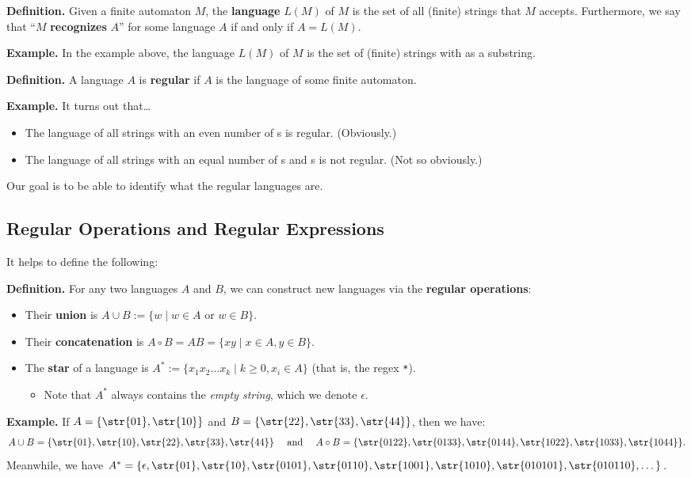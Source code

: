 \textbf{Definition.}
Given a finite automaton $M$,
the \textbf{language} $L(M)$ of $M$
is the set of all (finite) strings that $M$ accepts.
Furthermore, we say that
``$M$ \textbf{recognizes} $A$'' for some language $A$
if and only if $A = L(M)$.

\textbf{Example.}
In the example above,
the language $L(M)$ of $M$ is
the set of (finite) strings with  as a substring.

\textbf{Definition.}
A language $A$ is \textbf{regular}
if $A$ is the language of some finite automaton.

\textbf{Example.} It turns out that\dots
\begin{itemize}
    \item The language of all strings with an even number of s
    is regular.  (Obviously.)
    \item The language of all strings with an equal number of
    s and s is not regular.  (Not so obviously.)
\end{itemize}
Our goal is to be able to identify what the regular languages are.

\subsection{Regular Operations and Regular Expressions}

It helps to define the following:

\textbf{Definition.}
For any two languages $A$ and $B$,
we can construct new languages via the \textbf{regular operations}:
\begin{itemize}
    \item Their \textbf{union} is
    $A \cup B := \{w \mid w \in A \text{ or } w \in B\}$.
    \item Their \textbf{concatenation} is
    $A \circ B = AB = \{xy \mid x \in A, y \in B\}$.
    \item The \textbf{star} of a language is
    $A^* := \{x_1x_2\dots x_k \mid k \geq 0, x_i \in A\}$
    (that is, the regex \verb|*|).
    \begin{itemize}
        \item Note that $A^*$ always contains
        the \emph{empty string}, which we denote $\epsilon$.
    \end{itemize}
\end{itemize}

\textbf{Example.}
If $A = \{\str{01}, \str{10}\}$ and
$B = \{\str{22}, \str{33}, \str{44}\}$,
then we have:
\[ A \cup B = \{\str{01}, \str{10},
\str{22}, \str{33}, \str{44}\}
~~~ \text{ and }  ~~~
A \circ B = \{\str{0122}, \str{0133}, \str{0144},
\str{1022}, \str{1033}, \str{1044}\}. \]
Meanwhile, we have $A^* = \{\epsilon,
\str{01}, \str{10}, \str{0101}, \str{0110}, \str{1001}, \str{1010},
\str{010101}, \str{010110}, \dots\}$.

